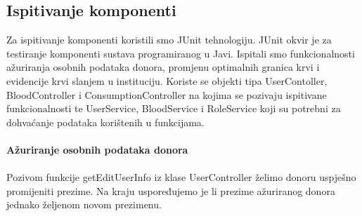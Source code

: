 			\subsection{Ispitivanje komponenti}
			
Za ispitivanje komponenti koristili smo JUnit tehnologiju. JUnit okvir je za testiranje komponenti sustava programiranog u Javi. Ispitali smo funkcionalnosti ažuriranja osobnih podataka donora, promjenu optimalnih granica krvi i evidencije krvi slanjem u instituciju. Koriste se objekti tipa UserContoller, BloodController i ConsumptionController na kojima se pozivaju ispitivane funkcionalnosti te UserService, BloodService i RoleService koji su potrebni za dohvaćanje podataka korištenih u funkcijama.
\\\\
\textbf{Ažuriranje osobnih podataka donora}
\\\\
Pozivom funkcije getEditUserInfo iz klase UserController želimo donoru uspješno promijeniti prezime. Na kraju uspoređujemo je li prezime ažuriranog donora jednako željenom novom prezimenu.


